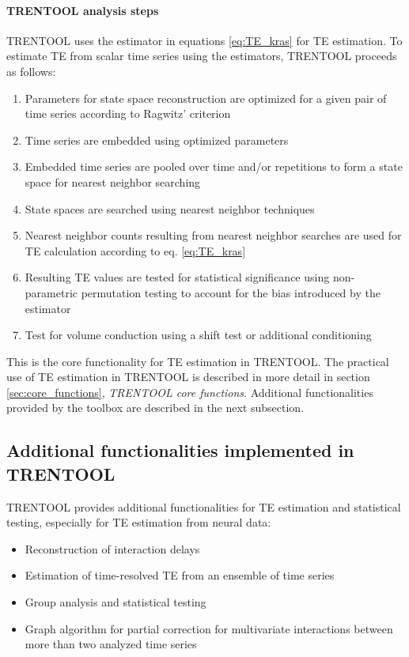 \documentclass[a4paper,10pt]{article}
\begin{document}
\paragraph*{TRENTOOL analysis steps} TRENTOOL uses the estimator in equations \ref{eq:TE_kras} for TE estimation. To estimate TE from scalar time series using the estimators, TRENTOOL proceeds as follows:

\begin{enumerate}
 \item Parameters for state space reconstruction are optimized for a given pair of time series according to Ragwitz' criterion \cite{ragwitz2002}
 \item Time series are embedded using optimized parameters
 \item Embedded time series are pooled over time and/or repetitions to form a state space for nearest neighbor searching 
 \item State spaces are searched using nearest neighbor techniques \cite{kraskov2004}
 \item Nearest neighbor counts resulting from nearest neighbor searches are used for TE calculation according to eq. \ref{eq:TE_kras}
 \item Resulting TE values are tested for statistical significance using non-parametric permutation testing to account for the bias introduced by the estimator \cite{lindner2011,vicente2011}
 \item Test for volume conduction using a shift test \cite{lindner2011} or additional conditioning \cite{faes2013}
\end{enumerate}

This is the core functionality for TE estimation in TRENTOOL. The practical use of TE estimation in TRENTOOL is described in more detail in section \ref{sec:core_functions}, \textit{TRENTOOL core functions}. Additional functionalities provided by the toolbox are described in the next subsection.

\subsection{Additional functionalities implemented in TRENTOOL} \label{sec:additional_functionalities}

TRENTOOL provides additional functionalities for TE estimation and statistical testing, especially for TE estimation from neural data:

\begin{itemize}
 \item Reconstruction of interaction delays \cite{wibral2013}
 \item Estimation of time-resolved TE from an ensemble of time series \cite{wollstadt2013,gomez-herrero2010}
 \item Group analysis and statistical testing \cite{lindner2011}
 \item Graph algorithm for partial correction for multivariate interactions between more than two analyzed time series \cite{wibralIEEE}
\end{itemize}
\end{document}
